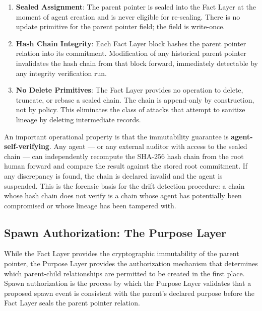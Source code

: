 \begin{enumerate}
    \item \textbf{Sealed Assignment}: The parent pointer is sealed into the Fact Layer at the moment of agent creation and is never eligible for re-sealing. There is no update primitive for the parent pointer field; the field is write-once.
    \item \textbf{Hash Chain Integrity}: Each Fact Layer block hashes the parent pointer relation into its commitment. Modification of any historical parent pointer invalidates the hash chain from that block forward, immediately detectable by any integrity verification run.
    \item \textbf{No Delete Primitives}: The Fact Layer provides no operation to delete, truncate, or rebase a sealed chain. The chain is append-only by construction, not by policy. This eliminates the class of attacks that attempt to sanitize lineage by deleting intermediate records.
\end{enumerate}

An important operational property is that the immutability guarantee is \textbf{agent-self-verifying}. Any agent — or any external auditor with access to the sealed chain — can independently recompute the SHA-256 hash chain from the root human forward and compare the result against the stored root commitment. If any discrepancy is found, the chain is declared invalid and the agent is suspended. This is the forensic basis for the drift detection procedure: a chain whose hash chain does not verify is a chain whose agent has potentially been compromised or whose lineage has been tampered with.

\subsection{Spawn Authorization: The Purpose Layer}

While the Fact Layer provides the cryptographic immutability of the parent pointer, the Purpose Layer provides the authorization mechanism that determines which parent-child relationships are permitted to be created in the first place. Spawn authorization is the process by which the Purpose Layer validates that a proposed spawn event is consistent with the parent's declared purpose before the Fact Layer seals the parent pointer relation.

